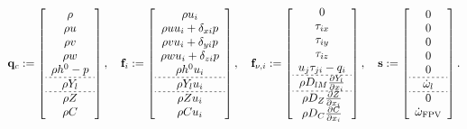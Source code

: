 \begin{equation}\label{eq:gemsGovVecs}
    \consVec \defEq \left[
    \begin{array}{c}
    \density \\
	\density \velX \\
	\density \velY \\
	\density \velZ \\
	\density \stagEnth - \pressure \\ \hdashline[2pt/2pt]
	\density \mfSpec \\ \hdashline[2pt/2pt]
	\density \mixFrac \\
	\density \progVar
    \end{array}
    \right] , \quad
    \invFluxDir \defEq \left[
    \begin{array}{c}
    \density \vel_{\spatialIdx} \\
	\density \velX \vel_{\spatialIdx} + \delta_{x \spatialIdx} \pressure \\
	\density \velY \vel_{\spatialIdx} + \delta_{y \spatialIdx} \pressure \\
	\density \velZ \vel_{\spatialIdx} + \delta_{z \spatialIdx} \pressure \\
	\density \stagEnth \vel_{\spatialIdx} \\ \hdashline[2pt/2pt]
	\density \mfSpec \vel_{\spatialIdx} \\ \hdashline[2pt/2pt]
	\density \mixFrac \vel_{\spatialIdx} \\
	\density \progVar \vel_{\spatialIdx}
    \end{array}
    \right] , \quad
	\viscFluxDir \defEq \left[
    \begin{array}{c}
    0 \\
	\shearStress_{\spatialIdx x} \\
	\shearStress_{\spatialIdx y} \\
	\shearStress_{\spatialIdx z} \\
	\vel_{\spatialIdxTwo} \shearStress_{\spatialIdxTwo \spatialIdx} - \heatFlux_{\spatialIdx} \\ \hdashline[2pt/2pt]
	\density \massDiffSpec \pde{\mfSpec}{x_{\spatialIdx}} \\ \hdashline[2pt/2pt]
	\density \massDiffVar_{\mixFrac} \pde{\mixFrac}{x_{\spatialIdx}} \\
	\density \massDiffVar_{\progVar} \pde{\progVar}{x_{\spatialIdx}}
    \end{array}
    \right], \quad
	\sourceVec \defEq \left[
    \begin{array}{c}
    0 \\
	0 \\
	0 \\
	0 \\
	0 \\ \hdashline[2pt/2pt]
	\prodRateSpecFR \\ \hdashline[2pt/2pt]
	0 \\
	\prodRateFPV
    \end{array} \right].
\end{equation}
